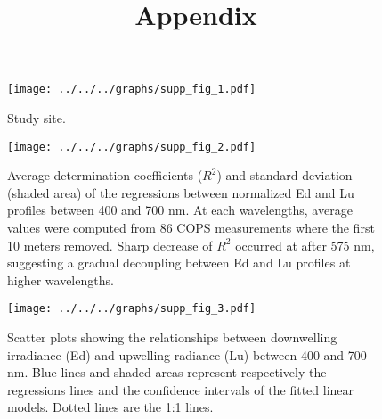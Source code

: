 \documentclass[12pt,a4paper]{scrartcl}
\title{Appendix}
\date{}
\begin{document}
\maketitle

\begin{figure}[h]
	\centering
	\texttt{[image: ../../../graphs/supp\_fig\_1.pdf]}
	\caption{Study site.}
\end{figure}

\clearpage
\newpage

\begin{figure}[h]
	\centering
	\texttt{[image: ../../../graphs/supp\_fig\_2.pdf]}
	\caption{Average determination coefficients ($R^2$) and standard deviation (shaded area) of the regressions between normalized Ed and Lu profiles between 400 and 700 nm. At each wavelengths, average values were computed from 86 COPS measurements where the first 10 meters removed. Sharp decrease of $R^2$ occurred at after 575 nm, suggesting a gradual decoupling between Ed and Lu profiles at higher wavelengths.}
\end{figure}
	
\clearpage
\newpage
	
\begin{figure}[h]
	\centering
	\texttt{[image: ../../../graphs/supp\_fig\_3.pdf]}
	\caption{Scatter plots showing the relationships between downwelling irradiance (Ed) and upwelling radiance (Lu) between 400 and 700 nm. Blue lines and shaded areas represent respectively the regressions lines and the confidence intervals of the fitted linear models. Dotted lines are the 1:1 lines.}
\end{figure}
	
\end{document}
